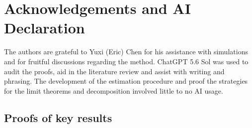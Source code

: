 \documentclass[11pt]{article}
\begin{document}
\section{Acknowledgements and AI Declaration}
The authors are grateful to Yuxi (Eric) Chen for his assistance with simulations and for fruitful discussions regarding the method. ChatGPT 5.6 Sol was used to audit the proofs, aid in the literature review and assist with writing and phrasing. The development of the estimation procedure and proof the strategies for the limit theorems and decomposition involved little to no AI usage. 

\break

\begin{appendices}

\section{Proofs of key results}




\end{appendices}
\end{document}
